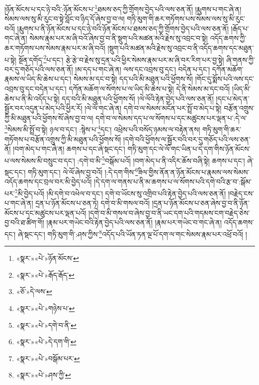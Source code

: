 །ཉོན་མོངས་པ་དང་ཉེ་བའི་:ཉོན་མོངས་པ་\footnote{«སྣར་»«པེ་»ཉོན་མོངས་}ཐམས་ཅད་ཀྱི་གྲོགས་བྱེད་པའི་ལས་ཅན་ནོ། །རྨུགས་པ་གང་ཞེ་ན། སེམས་ལས་སུ་མི་རུང་བ་སྟེ་བློང་བ་ཉིད་དོ་ཞེས་བྱ་བ་ལ། གཏི་མུག་གི་ཆར་གཏོགས་པས་སེམས་ལས་སུ་མི་རུང་བའོ། །རྨུགས་པ་ནི་ཉོན་མོངས་པ་དང་ཉེ་བའི་ཉོན་མོངས་པ་ཐམས་ཅད་ཀྱི་གྲོགས་བྱེད་པའི་ལས་ཅན་ནོ། །རྒོད་པ་གང་ཞེ་ན། སེམས་རྣམ་པར་མ་ཞི་བའོ་ཞེས་བྱ་བ་ནི་སྡུག་པའི་མཚན་མའི་རྗེས་སུ་འབྲང་བ་སྟེ། འདོད་ཆགས་ཀྱི་ཆར་གཏོགས་པས་སེམས་རྣམ་པར་མ་ཞི་བའོ། །སྡུག་པའི་མཚན་མའི་རྗེས་སུ་འབྲང་བ་ནི་འདོད་ཆགས་དང་མཐུན་པ་སྟེ། སྔོན་དགོད་\footnote{«སྣར་»«པེ་»རྒོད་རྒོད་}པ་དང་། རྩེ་རྩེ་བ་རྗེས་སུ་དྲན་པའི་ཕྱིར་སེམས་རྣམ་པར་མ་ཞི་བར་རིག་པར་བྱ་སྟེ། ཞི་གནས་ཀྱི་བར་དུ་གཅོད་པའི་ལས་ཅན་ནོ། །མ་དད་པ་གང་ཞེ་ན། ལས་དང་འབྲས་བུ་དང་། བདེན་པ་དང་། དཀོན་མཆོག་རྣམས་ལ་ཡིད་མི་ཆེས་པ་དང་། སེམས་མ་དང་བ་སྟེ། དད་པའི་མི་མཐུན་པའི་ཕྱོགས་སོ། །གོང་དུ་སྨོས་པའི་ལས་དང་འབྲས་བུ་དང་བདེན་པ་དང་། དཀོན་མཆོག་ལ་སོགས་པ་ལ་ཡིད་མི་ཆེས་པ་སྟེ། དེ་ནི་སེམས་མ་དང་བའོ། །ཡིད་མི་ཆེས་པ་ནི་མི་འདོད་པ་སྟེ། དད་བའི་མི་མཐུན་པའི་ཕྱོགས་སོ། །ལེ་ལོའི་རྟེན་བྱེད་པའི་ལས་ཅན་ནོ། །དང་པ་མེད་ན་སྦྱོར་བར་འདུན་པ་མེད་པའི་ཕྱིར་རོ། །ལེ་ལོ་གང་ཞེ་ན། དགེ་བ་ལ་སེམས་མངོན་པར་སྤྲོ་བ་མེད་པ་སྟེ། བརྩོན་འགྲུས་ཀྱི་མི་མཐུན་པའི་ཕྱོགས་སོ་ཞེས་བྱ་བ་ལ། དགེ་བ་ལ་སེམས་དད་པ་ལ་སོགས་པ་དང་མཚུངས་པར་ལྡན་པ་:དེ་ལ་\footnote{«ཅོ་»དེ་ལས་}སེམས་མི་སྤྲོ་བ་སྟེ། ཉལ་བ་དང་། :སྙེས་པ་\footnote{«སྣར་»«པེ་»གཉེས་པ་}དང་། འཕྲེས་པའི་བསོད་ཉམས་ལ་བརྟེན་ནས། གཏི་མུག་གི་ཆར་གཏོགས་པ་བརྩོན་འགྲུས་ཀྱི་མི་མཐུན་པའི་ཕྱོགས་སོ། །དགེ་བའི་ཕྱོགས་ལ་སྦྱོར་བའི་བར་དུ་གཅོད་པའི་ལས་ཅན་ནོ། །བག་མེད་པ་གང་ཞེ་ན། ཆགས་པ་དང་ཞེ་སྡང་དང་། གཏི་མུག་དང་ལེ་ལོ་གང་ཡིན་པ་དེ་དག་གིས་ཉོན་མོངས་པ་ལས་སེམས་མི་བསྲུང་བ་དང་། :དགེ་བ་མི་\footnote{«སྣར་»«པེ་»དགེ་བ་ནི་}བསྒོམ་པའོ། །བག་མེད་པ་ནི་འདིར་ཆོས་བཞི་སྟེ། ཆགས་པ་དང་། ཞེ་སྡང་དང་། གཏི་མུག་དང་། ལེ་ལོ་ཞེས་བྱ་བའོ། །:དེ་དག་གིས་\footnote{«སྣར་»«པེ་»དེ་དག་གི་}ཟིལ་གྱིས་ནོན་ན་ཉོན་མོངས་པ་རྣམས་ལས་སེམས་འདོད་ཆགས་དང་བྲལ་བར་མི་བྱེད་པའོ། །དེ་དག་ལ་གནས་པ་ནི་མ་ཆགས་པ་ལ་སོགས་པའི་དགེ་བའི་རྩ་བ་:སྒོམ་པར་\footnote{«སྣར་»«པེ་»བསྒོམ་པར་}མི་བྱེད་པའོ། །མི་དགེ་བ་འཕེལ་བ་དང་། དགེ་བ་ཡོངས་སུ་འགྲིབ་པའི་རྟེན་བྱེད་པའི་ལས་ཅན་ནོ། །བརྗེད་ངས་པ་གང་ཞེ་ན། དྲན་པ་ཉོན་མོངས་པ་ཅན་ཏེ། དགེ་བ་མི་གསལ་བའོ། །དྲན་པ་ཉོན་མོངས་པ་ཅན་ཞེས་བྱ་བ་ནི་ཉོན་མོངས་པ་དང་མཚུངས་པར་ལྡན་པའོ། །དགེ་བ་མི་གསལ་བ་ཞེས་བྱ་བ་ནི་ཡང་དག་པའི་གདམས་ངག་བརྗེད་ཅེས་བྱ་བའི་ཐ་ཚིག་གོ། །རྣམ་པར་གཡེང་བའི་རྟེན་བྱེད་པའི་ལས་ཅན་ནོ། །རྣམ་པར་གཡེང་བ་གང་ཞེ་ན། འདོད་ཆགས་དང་། ཞེ་སྡང་དང་། གཏི་མུག་གི་:ཤས་ཀྱིས་\footnote{«སྣར་»«པེ་»ཤས་ཀྱི་}འདོད་པའི་ཡོན་ཏན་ལྔ་པོ་དག་ལ་གང་སེམས་རྣམ་པར་འཕྲོ་བའོ། །
